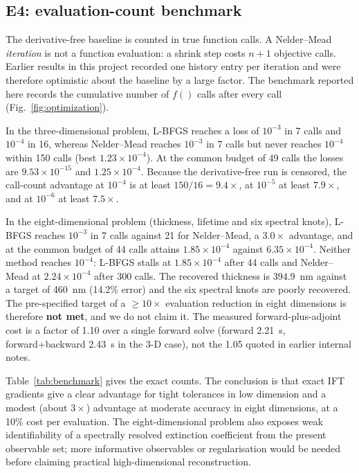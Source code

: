 \documentclass[preprint,12pt]{elsarticle}
\begin{document}
\subsection{E4: evaluation-count benchmark}
\label{sec:e4}

The derivative-free baseline is counted in true function calls. A Nelder--Mead
\emph{iteration} is not a function evaluation: a shrink step costs $n+1$
objective calls. Earlier results in this project recorded one history entry
per iteration and were therefore optimistic about the baseline by a large
factor. The benchmark reported here records the cumulative number of
$f()$ calls after every call (Fig.~\ref{fig:optimization}).

In the three-dimensional problem, L-BFGS reaches a loss of $10^{-3}$ in 7
calls and $10^{-4}$ in 16, whereas Nelder--Mead reaches $10^{-3}$ in 7 calls
but never reaches $10^{-4}$ within 150 calls (best
$1.23\times10^{-4}$). At the common budget of 49 calls the losses are
$9.53\times10^{-15}$ and $1.25\times10^{-4}$. Because the derivative-free
run is censored, the call-count advantage at $10^{-4}$ is at least
$150/16=9.4\times$, at $10^{-5}$ at least $7.9\times$, and at $10^{-6}$ at
least $7.5\times$.

In the eight-dimensional problem (thickness, lifetime and six spectral
knots), L-BFGS reaches $10^{-3}$ in 7 calls against 21 for Nelder--Mead, a
$3.0\times$ advantage, and at the common budget of 44 calls attains
$1.85\times10^{-4}$ against $6.35\times10^{-4}$. Neither method reaches
$10^{-4}$: L-BFGS stalls at $1.85\times10^{-4}$ after 44 calls and
Nelder--Mead at $2.24\times10^{-4}$ after 300 calls. The recovered thickness
is 394.9~nm against a target of 460~nm (14.2\% error) and the six spectral
knots are poorly recovered. The pre-specified target of a $\ge10\times$
evaluation reduction in eight dimensions is therefore \textbf{not met}, and
we do not claim it. The measured forward-plus-adjoint cost is a factor of 1.10 over a
single forward solve (forward 2.21~s, forward+backward 2.43~s in the 3-D
case), not the 1.05 quoted in earlier internal notes.

Table~\ref{tab:benchmark} gives the exact counts. The conclusion is
that exact IFT gradients give a clear advantage for tight tolerances in low
dimension and a modest (about $3\times$) advantage at moderate accuracy in
eight dimensions, at a 10\% cost per evaluation. The eight-dimensional
problem also exposes weak identifiability of a spectrally resolved extinction
coefficient from the present observable set; more informative observables or
regularisation would be needed before claiming practical high-dimensional
reconstruction.
\end{document}
